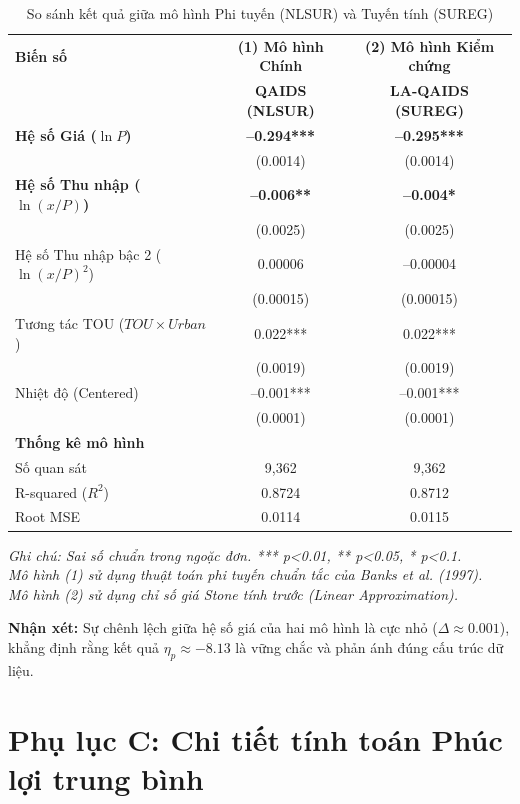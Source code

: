 \documentclass[12pt,a4paper,oneside]{article}
\begin{document}
\begin{table}[H]
	\centering
	\caption{So sánh kết quả giữa mô hình Phi tuyến (NLSUR) và Tuyến tính (SUREG)}
	\label{tab:robustness}
	\begin{tabular}{l c c}
		\toprule
		\textbf{Biến số} & \textbf{(1) Mô hình Chính} & \textbf{(2) Mô hình Kiểm chứng} \\
		& \textbf{QAIDS (NLSUR)} & \textbf{LA-QAIDS (SUREG)} \\
		\midrule
		\textbf{Hệ số Giá ($\ln P$)} & \textbf{–0.294***} & \textbf{–0.295***} \\
		& (0.0014) & (0.0014) \\
		\addlinespace
		\textbf{Hệ số Thu nhập ($\ln (x/P)$)} & \textbf{–0.006**} & \textbf{–0.004*} \\
		& (0.0025) & (0.0025) \\
		\addlinespace
		Hệ số Thu nhập bậc 2 ($\ln (x/P)^2$) & 0.00006 & –0.00004 \\
		& (0.00015) & (0.00015) \\
		\addlinespace
		Tương tác TOU ($TOU \times Urban$) & 0.022*** & 0.022*** \\
		& (0.0019) & (0.0019) \\
		\addlinespace
		Nhiệt độ (Centered) & –0.001*** & –0.001*** \\
		& (0.0001) & (0.0001) \\
		\midrule
		\textbf{Thống kê mô hình} & & \\
		Số quan sát & 9,362 & 9,362 \\
		R-squared ($R^2$) & 0.8724 & 0.8712 \\
		Root MSE & 0.0114 & 0.0115 \\
		\bottomrule
	\end{tabular}
	\footnotesize{
		\textit{Ghi chú: Sai số chuẩn trong ngoặc đơn. *** p<0.01, ** p<0.05, * p<0.1. \\
			Mô hình (1) sử dụng thuật toán phi tuyến chuẩn tắc của Banks et al. (1997). \\
			Mô hình (2) sử dụng chỉ số giá Stone tính trước (Linear Approximation).}
	}
\end{table}

\noindent \textbf{Nhận xét:} Sự chênh lệch giữa hệ số giá của hai mô hình là cực nhỏ ($\Delta \approx 0.001$), khẳng định rằng kết quả $\eta_p \approx -8.13$ là vững chắc và phản ánh đúng cấu trúc dữ liệu.

\section{Phụ lục C: Chi tiết tính toán Phúc lợi trung bình}
\end{document}
